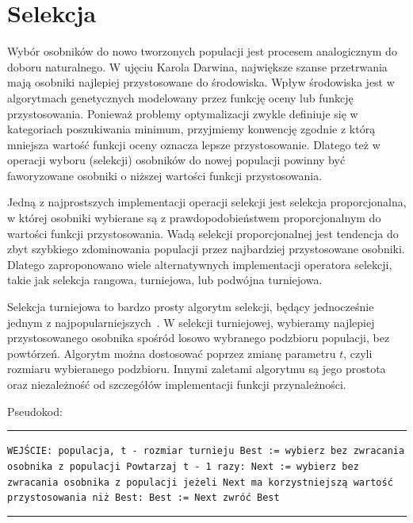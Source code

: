 \documentclass{xmgr}
\begin{document}
\section{Selekcja}

Wybór osobników do nowo tworzonych populacji jest procesem analogicznym do doboru naturalnego. W ujęciu Karola Darwina, największe szanse przetrwania mają osobniki najlepiej przystosowane do środowiska. Wpływ środowiska jest w algorytmach genetycznych modelowany przez funkcję oceny lub funkcję przystosowania. Ponieważ problemy optymalizacji zwykle definiuje się w kategoriach poszukiwania minimum, przyjmiemy konwencję zgodnie z którą mniejsza wartość funkcji oceny oznacza lepsze przystosowanie. Dlatego też w operacji wyboru (selekcji) osobników do nowej populacji powinny być faworyzowane osobniki o niższej wartości funkcji przystosowania.

Jedną z najprostszych implementacji operacji selekcji jest selekcja proporcjonalna, w której osobniki wybierane są z prawdopodobieństwem proporcjonalnym do wartości funkcji przystosowania. Wadą selekcji proporcjonalnej jest tendencja do zbyt szybkiego zdominowania populacji przez najbardziej przystosowane osobniki. Dlatego zaproponowano wiele alternatywnych implementacji operatora selekcji, takie jak selekcja rangowa, turniejowa, lub podwójna turniejowa.

Selekcja turniejowa to bardzo prosty algorytm selekcji, będący jednocześnie jednym z najpopularniejszych~\cite{Luke2009Metaheuristics}. W selekcji turniejowej, wybieramy najlepiej przystosowanego osobnika spośród losowo wybranego podzbioru populacji, bez powtórzeń. Algorytm można dostosować poprzez zmianę parametru $t$, czyli rozmiaru wybieranego podzbioru. Innymi zaletami algorytmu są jego prostota oraz niezależność od szczegółów implementacji funkcji przynależności.

Pseudokod:

\noindent
\rule{380pt}{0.5pt}\newline
\texttt{WEJŚCIE: populacja, t - rozmiar turnieju\newline
Best := wybierz bez zwracania osobnika z populacji\newline
Powtarzaj t - 1 razy:\newline
\indent Next := wybierz bez zwracania osobnika z populacji\newline
\indent jeżeli Next ma korzystniejszą wartość przystosowania niż Best:\newline
\indent\indent Best := Next\newline
zwróć Best\newline
}
\rule{380pt}{0.5pt}\newline
\end{document}
